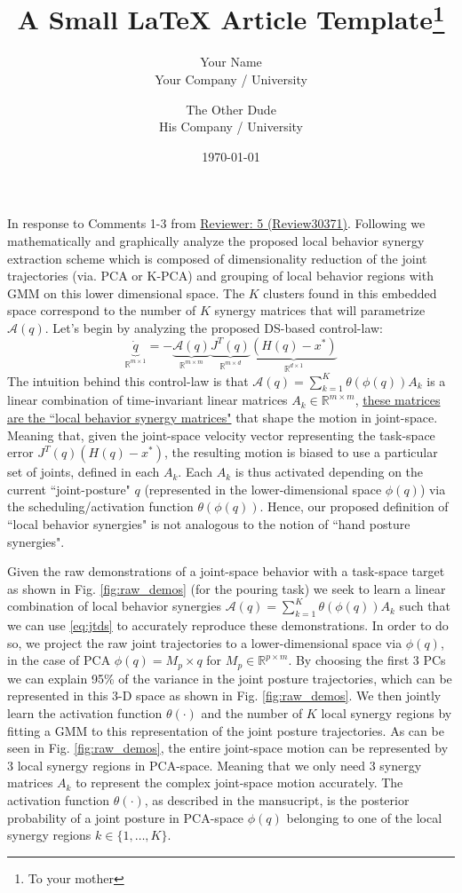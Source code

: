 \documentclass{article}
\title{A Small \LaTeX{} Article Template\thanks{To your mother}}
\author{Your Name  \\
	Your Company / University  \\
	\and 
	The Other Dude \\
	His Company / University \\
	}
\date{\today}
\begin{document}
\vspace{-10pt}
In response to Comments 1-3 from \underline{Reviewer: 5 (Review30371)}. Following we mathematically and graphically analyze the proposed local behavior synergy extraction scheme which is composed of dimensionality reduction of the joint trajectories (via. PCA or K-PCA) and grouping of local behavior regions with GMM on this lower dimensional space. The $K$ clusters found in this embedded space correspond to the number of $K$ synergy matrices that will parametrize $\mathcal{A}(q)$. Let's begin by analyzing the proposed DS-based control-law:
\begin{equation}
\underbrace{\dot{q}}_{\mathbb{R}^{m\times 1}} = -\underbrace{\mathcal{A}(q)}_{\mathbb{R}^{m\times m}}\underbrace{J^{T}(q)}_{\mathbb{R}^{m\times d}}\underbrace{(H(q)-x^*)}_{\mathbb{R}^{d\times 1}}
\label{eq:jtds}
\end{equation}
The intuition behind this control-law is that $\mathcal{A}(q) = \sum\limits_{k=1}^{K}\theta(\phi(q))A_k$ is a linear combination of time-invariant linear matrices $A_k \in \mathbb{R}^{m \times m}$, \underline{these matrices are the ``local behavior synergy matrices"} that shape the motion in joint-space. Meaning that, given the joint-space velocity vector representing the task-space error $J^{T}(q)(H(q)-x^*)$, the resulting motion is biased to use a particular set of joints, defined in each $A_k$. Each $A_k$ is thus activated depending on the current ``joint-posture" $q$ (represented in the lower-dimensional space $\phi(q)$) via the scheduling/activation function $\theta(\phi(q))$. Hence, our proposed definition of ``local behavior synergies" is not analogous to the notion of ``hand posture synergies". 

Given the raw demonstrations of a joint-space  behavior with a task-space target as shown in Fig. \ref{fig:raw_demos} (for the pouring task) we seek to learn a linear combination of local behavior synergies $\mathcal{A}(q) = \sum\limits_{k=1}^{K}\theta(\phi(q))A_k$ such that we can use \eqref{eq:jtds} to accurately reproduce these demonstrations. In order to do so, we project the raw joint trajectories to a lower-dimensional space via $\phi(q)$, in the case of PCA $\phi(q)=M_p \times q$ for $M_p \in \mathbb{R}^{p \times m}$. By choosing the first 3 PCs we can explain 95\% of the variance in the joint posture trajectories, which can be represented in this 3-D space as shown in Fig. \ref{fig:raw_demos}. We then jointly learn the activation function $\theta(\cdot)$ and the number of $K$ local synergy regions by fitting a GMM to this representation of the joint posture trajectories. As can be seen in Fig. \ref{fig:raw_demos}, the entire joint-space motion can be represented by 3 local synergy regions in PCA-space. Meaning that we only need 3 synergy matrices $A_k$ to represent the complex joint-space motion accurately. The activation function $\theta(\cdot)$, as described in the mansucript, is the posterior probability of a joint posture in PCA-space $\phi(q)$ belonging to one of the local synergy regions $k \in \{1,\dots,K\}$.
\end{document}
